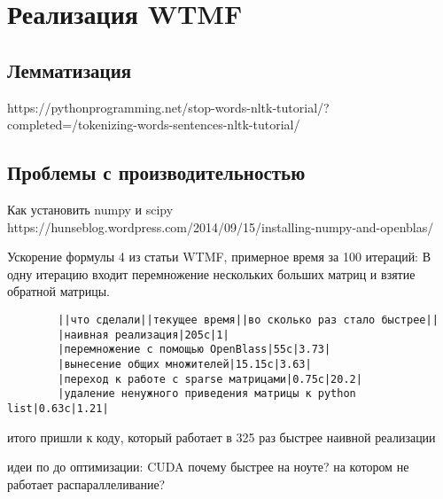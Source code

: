 \section{Реализация WTMF}
    \subsection{Лемматизация}
        https://pythonprogramming.net/stop-words-nltk-tutorial/?completed=/tokenizing-words-sentences-nltk-tutorial/

    \subsection{Проблемы с производительностью}
        Как установить numpy и scipy
        https://hunseblog.wordpress.com/2014/09/15/installing-numpy-and-openblas/


        Ускорение формулы 4 из статьи WTMF, примерное время за 100 итераций:
        В одну итерацию входит перемножение нескольких больших матриц и взятие обратной матрицы.

        \begin{verbatim}
        ||что сделали||текущее время||во сколько раз стало быстрее||
        |наивная реализация|205с|1|
        |перемножение с помощью OpenBlass|55с|3.73|
        |вынесение общих множителей|15.15с|3.63|
        |переход к работе с sparse матрицами|0.75с|20.2|
        |удаление ненужного приведения матрицы к python list|0.63c|1.21|
        \end{verbatim}
        итого пришли к коду, который работает в 325 раз быстрее наивной реализации

        идеи по до оптимизации: CUDA
        почему быстрее на ноуте? на котором не работает распараллеливание?
